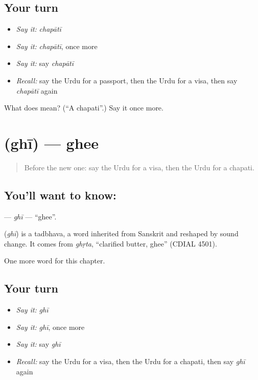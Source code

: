 \subsection*{Your turn}
\begin{itemize}
\raggedright
  \item \emph{Say it:} \emph{chapātī}
  \item \emph{Say it:} \emph{chapātī}, once more
  \item \emph{Say it:} say \emph{chapātī}
  \item \emph{Recall:} say the Urdu for a passport, then the Urdu for a visa, then say \emph{chapātī} again
\end{itemize}

\begin{tcolorbox}[breakable,colback=teal!4,colframe=teal!35!black,title={Before you move on}]
What does  mean? (\textquotedblleft{}A chapati\textquotedblright{}.) Say it once more.
\end{tcolorbox}
\section[\texorpdfstring{\ur{گھی} (ghī)}{گھی (ghī)}]{ (ghī) — ghee}

\label{lesson:UR-C199-ghi}



\begin{quote}
Before the new one: say the Urdu for a visa, then the Urdu for a chapati.
\end{quote}

\subsection*{You'll want to know: }
\textbf{} — \emph{ghī} — \textquotedblleft{}ghee\textquotedblright{}.

\begin{cousinweb}
\textbf{} (\emph{ghī}) is a tadbhava, a word inherited from Sanskrit and reshaped by sound change. It comes from \emph{ghṛta}, \textquotedblleft{}clarified butter, ghee\textquotedblright{} (CDIAL 4501).
\end{cousinweb}

\begin{grammarlens}[title={What you've built}]
One more word for this chapter.
\end{grammarlens}

\subsection*{Your turn}
\begin{itemize}
\raggedright
  \item \emph{Say it:} \emph{ghī}
  \item \emph{Say it:} \emph{ghī}, once more
  \item \emph{Say it:} say \emph{ghī}
  \item \emph{Recall:} say the Urdu for a visa, then the Urdu for a chapati, then say \emph{ghī} again
\end{itemize}

